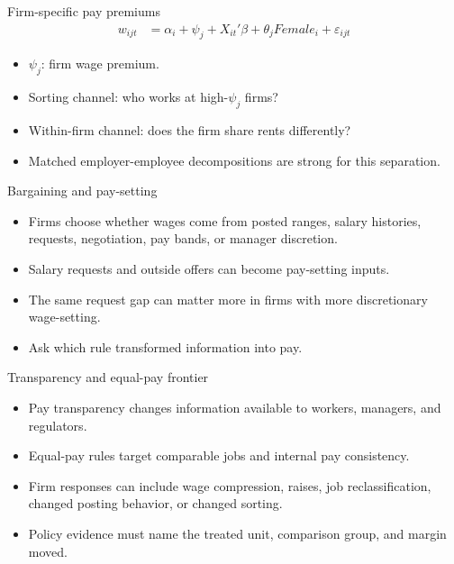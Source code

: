 \documentclass[aspectratio=169,11pt]{beamer}
\begin{document}
\begin{frame}{Firm-specific pay premiums}
\[
\begin{aligned}
w_{ijt}
&=\alpha_i+\psi_j+X_{it}'\beta+\theta_j Female_i+\varepsilon_{ijt}
\end{aligned}
\]
\begin{itemize}
    \item \(\psi_j\): firm wage premium.
    \item Sorting channel: who works at high-\(\psi_j\) firms?
    \item Within-firm channel: does the firm share rents differently?
    \item Matched employer-employee decompositions are strong for this separation.
\end{itemize}
\end{frame}

\begin{frame}{Bargaining and pay-setting}
\begin{itemize}
    \item Firms choose whether wages come from posted ranges, salary histories, requests, negotiation, pay bands, or manager discretion.
    \item Salary requests and outside offers can become pay-setting inputs.
    \item The same request gap can matter more in firms with more discretionary wage-setting.
    \item Ask which rule transformed information into pay.
\end{itemize}
\end{frame}

\begin{frame}{Transparency and equal-pay frontier}
\begin{itemize}
    \item Pay transparency changes information available to workers, managers, and regulators.
    \item Equal-pay rules target comparable jobs and internal pay consistency.
    \item Firm responses can include wage compression, raises, job reclassification, changed posting behavior, or changed sorting.
    \item Policy evidence must name the treated unit, comparison group, and margin moved.
\end{itemize}
\end{frame}
\end{document}
